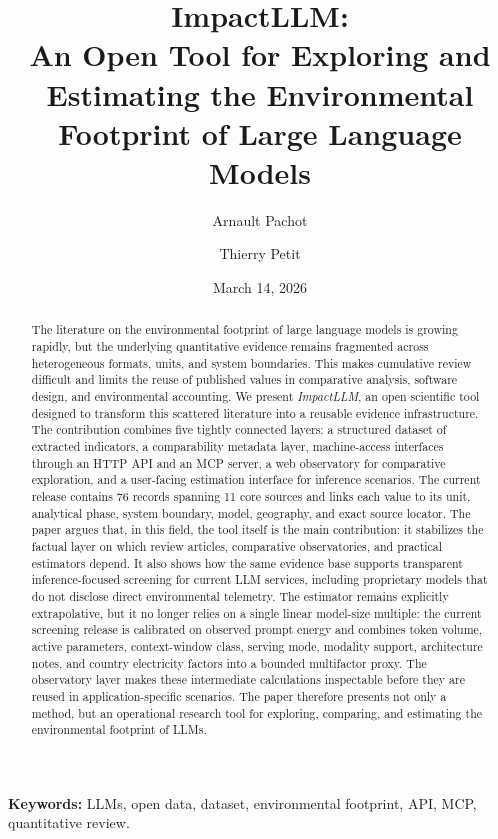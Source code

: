 \documentclass[11pt,a4paper]{article}
\title{ImpactLLM:\\An Open Tool for Exploring and Estimating the Environmental Footprint of Large Language Models}
\author{Arnault Pachot \and Thierry Petit}
\date{March 14, 2026}
\begin{document}
\maketitle

\begin{abstract}
The literature on the environmental footprint of large language models is growing rapidly, but the underlying quantitative evidence remains fragmented across heterogeneous formats, units, and system boundaries. This makes cumulative review difficult and limits the reuse of published values in comparative analysis, software design, and environmental accounting. We present \emph{ImpactLLM}, an open scientific tool designed to transform this scattered literature into a reusable evidence infrastructure. The contribution combines five tightly connected layers: a structured dataset of extracted indicators, a comparability metadata layer, machine-access interfaces through an HTTP API and an MCP server, a web observatory for comparative exploration, and a user-facing estimation interface for inference scenarios. The current release contains 76 records spanning 11 core sources and links each value to its unit, analytical phase, system boundary, model, geography, and exact source locator. The paper argues that, in this field, the tool itself is the main contribution: it stabilizes the factual layer on which review articles, comparative observatories, and practical estimators depend. It also shows how the same evidence base supports transparent inference-focused screening for current LLM services, including proprietary models that do not disclose direct environmental telemetry. The estimator remains explicitly extrapolative, but it no longer relies on a single linear model-size multiple: the current screening release is calibrated on observed prompt energy and combines token volume, active parameters, context-window class, serving mode, modality support, architecture notes, and country electricity factors into a bounded multifactor proxy. The observatory layer makes these intermediate calculations inspectable before they are reused in application-specific scenarios. The paper therefore presents not only a method, but an operational research tool for exploring, comparing, and estimating the environmental footprint of LLMs.
\end{abstract}

\textbf{Keywords:} LLMs, open data, dataset, environmental footprint, API, MCP, quantitative review.
\end{document}
